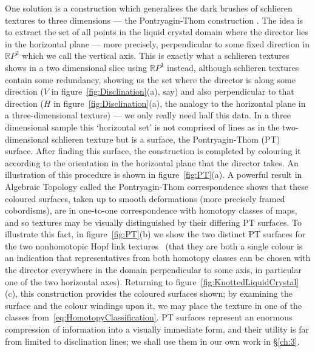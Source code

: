 One solution is a construction which generalises the dark brushes of schlieren textures to three dimensions --- the Pontryagin-Thom construction \citep{ChenThesis,Chen2013,MachonThesis,AlexanderBook}. The idea is to extract the set of all points in the liquid crystal domain where the director lies in the  horizontal plane --- more precisely, perpendicular to some fixed direction in $\mathbb{R}P^2$ which we call the vertical axis. This is exactly what a schlieren textures shows in a two dimensional slice using $\mathbb{R}P^1$ instead, although schlieren textures contain some redundancy, showing us the set where the director is along some direction ($V$ in figure~\ref{fig:Disclination}(a), say) and also perpendicular to that direction ($H$ in figure~\ref{fig:Disclination}(a), the analogy to the horizontal plane in a three-dimensional texture)  --- we only really need half this data. In a three dimensional sample this `horizontal set' is not comprised of lines as in the two-dimensional schlieren texture but is a surface, the Pontryagin-Thom (PT) surface. After finding this surface, the construction is completed by colouring it according to the orientation in the horizontal plane that the director takes. An illustration of this procedure is shown in figure~\ref{fig:PT}(a). A powerful result in Algebraic Topology called the Pontryagin-Thom correspondence \citep{Milnor1997,Hatcher2012} shows that these coloured surfaces, taken up to smooth deformations (more precisely framed cobordisms), are in one-to-one correspondence with homotopy classes of maps, and so textures may be visually distinguished by their differing PT surfaces. To illustrate this fact, in figure~\ref{fig:PT}(b) we show the two distinct PT surfaces for the two nonhomotopic Hopf link textures~\citep{MachonThesis} (that they are both a single colour is an indication that representatives from both homotopy classes can be chosen with the director everywhere in the domain perpendicular to some axis, in particular one of the two horizontal axes). Returning to figure~\ref{fig:KnottedLiquidCrystal}(c), this construction provides the coloured surfaces shown; by examining the surface and the colour windings upon it, we may place the texture in one of the classes from~\eqref{eq:HomotopyClassification}. PT surfaces represent an enormous compression of information into a visually immediate form, and their utility is far from limited to disclination lines; we shall use them in our own work in \S\ref{ch:3}.

